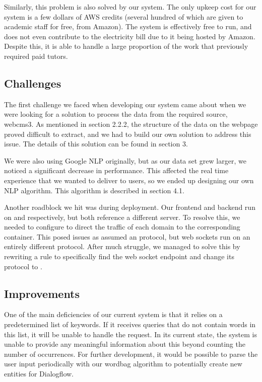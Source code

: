 Similarly, this problem is also solved by our system. The only upkeep cost for our system is a few dollars of AWS credits (several hundred of which are given to academic staff for free, from Amazon). The system is effectively free to run, and does not even contribute to the electricity bill due to it being hosted by Amazon. Despite this, it is able to handle a large proportion of the work that previously required paid tutors.

\subsection{Challenges}
The first challenge we faced when developing our system came about when we were looking for a solution to process the data from the required source, webcms3. As mentioned in section 2.2.2, the structure of the data on the webpage proved difficult to extract, and we had to build our own solution to address this issue. The details of this solution can be found in section 3.

We were also using Google NLP originally, but as our data set grew larger, we noticed a significant decrease in performance. This affected the real time experience that we wanted to deliver to users, so we ended up designing our own NLP algorithm. This algorithm is described in section 4.1.

Another roadblock we hit was during deployment. Our frontend and backend run on  and  respectively, but both reference a different server. To resolve this, we needed to configure  to direct the traffic of each domain to the corresponding  container. This posed issues as  assumed an  protocol, but web sockets run on an entirely different protocol. After much struggle, we managed to solve this by rewriting a rule to specifically find the web socket endpoint and change its protocol to .

\subsection{Improvements}
One of the main deficiencies of our current system is that it relies on a predetermined list of keywords. If it receives queries that do not contain words in this list, it will be unable to handle the request. In its current state, the system is unable to provide any meaningful information about this beyond counting the number of occurrences. For further development, it would be possible to parse the user input periodically with our wordbag algorithm to potentially create new entities for Dialogflow.

